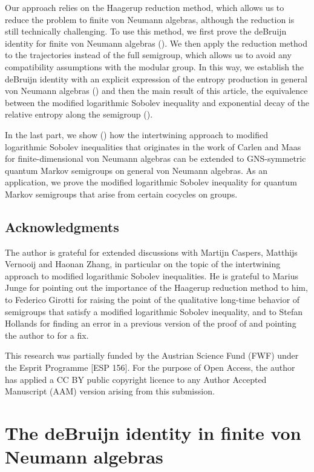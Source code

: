 \documentclass[12pt,a4paper]{amsart}
\newcommand{\1}{\mathds{1}}
\theoremstyle{plain}
\theoremstyle{definition}
\theoremstyle{remark}
\begin{document}
Our approach relies on the Haagerup reduction method, which allows us to reduce the problem to finite von Neumann algebras, although the reduction is still technically challenging. To use this method, we first prove the deBruijn identity for finite von Neumann algebras (). We then apply the reduction method to the trajectories instead of the full semigroup, which allows us to avoid any compatibility assumptions with the modular group. In this way, we establish the deBruijn identity with an explicit expression of the entropy production in general von Neumann algebras () and then the main result of this article, the equivalence between the modified logarithmic Sobolev inequality and exponential decay of the relative entropy along the semigroup ().

In the last part, we show () how the intertwining approach to modified logarithmic Sobolev inequalities that originates in the work of Carlen and Maas for finite-dimensional von Neumann algebras \cite{CM17,CM20} can be extended to GNS-symmetric quantum Markov semigroups on general von Neumann algebras. As an application, we prove the modified logarithmic Sobolev inequality for quantum Markov semigroups that arise from certain cocycles on groups.


\subsection*{Acknowledgments}
The author is grateful for extended discussions with Martijn Caspers, Matthijs Vernooij and Haonan Zhang, in particular on the topic of the intertwining approach to modified logarithmic Sobolev inequalities. He is grateful to Marius Junge for pointing out the importance of the Haagerup reduction method to him, to Federico Girotti for raising the point of the qualitative long-time behavior of semigroups that satisfy a modified logarithmic Sobolev inequality, and to Stefan Hollands for finding an error in a previous version of the proof of  and pointing the author to \cite{FHSW22} for a fix.

This research was partially funded by the Austrian Science Fund (FWF) under the Esprit Programme [ESP 156]. For the purpose of Open Access, the author has applied a CC BY public copyright licence to any Author Accepted Manuscript (AAM) version arising from this submission.

\section{The deBruijn identity in finite von Neumann algebras}
\end{document}
